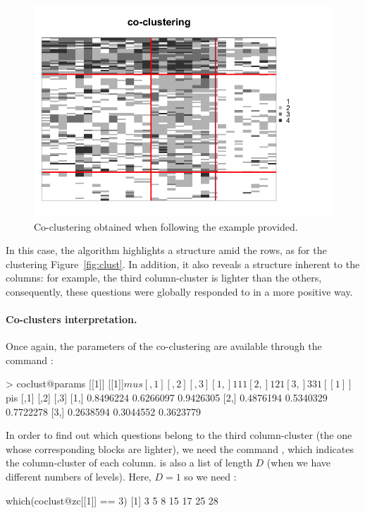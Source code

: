 \begin{figure}[ht!]
\centering
  \includegraphics[width = .8\textwidth]{images/coclust.png}
    \caption{Co-clustering obtained when following the example provided.}
    \label{fig:coclust}
\end{figure}



In this case, the algorithm highlights a structure amid the rows, as for the clustering Figure~\ref{fig:clust}. In addition, it also reveals a structure inherent to the columns: for example, the third column-cluster is lighter than the others, consequently, these questions were globally responded to in a more positive way.

\paragraph{Co-clusters interpretation.} Once again, the parameters of the co-clustering are available through the command :
\begin{example}
> coclust@params
[[1]]
[[1]]$mus
     [,1] [,2] [,3]
[1,]    1    1    1
[2,]    1    2    1
[3,]    3    3    1

[[1]]$pis
          [,1]      [,2]      [,3]
[1,] 0.8496224 0.6266097 0.9426305
[2,] 0.4876194 0.5340329 0.7722278
[3,] 0.2638594 0.3044552 0.3623779
\end{example}

In order to find out which questions belong to the third column-cluster (the one whose corresponding blocks are lighter), we need the command , which indicates the column-cluster of each column.  is also a list of length $D$ (when we have different numbers of levels). Here, $D=1$ so we need : 
\begin{example}
which(coclust@zc[[1]] == 3)
[1]  3  5  8 15 17 25 28
\end{example}

